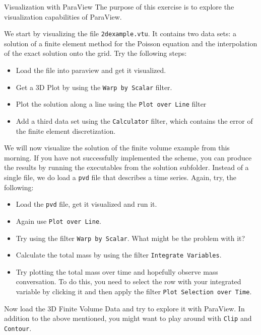 \documentclass[12pt,a4paper]{article}
\begin{document}
\begin{Exercise}{Visualization with ParaView}
 The purpose of this exercise is to explore the visualization capabilities of ParaView.

 We start by visualizing the file \lstinline!2dexample.vtu!. It contains two data sets: a solution of a finite element method
 for the Poisson equation and the interpolation of the exact solution onto the grid. Try the following steps:
 \begin{itemize}
  \item Load the file into paraview and get it visualized.
  \item Get a 3D Plot by using the \lstinline!Warp by Scalar! filter.
  \item Plot the solution along a line using the \lstinline!Plot over Line! filter
  \item Add a third data set using the \lstinline!Calculator! filter, which contains the error of the finite element discretization.
 \end{itemize}

 We will now visualize the solution of the finite volume example from this morning. If you have not successfully implemented the scheme,
 you can produce the results by running the executables from the solution subfolder. Instead of a single file, we do load a \lstinline!pvd!
 file that describes a time series. Again, try, the following:
 \begin{itemize}
  \item Load the \lstinline!pvd! file, get it visualized and run it.
  \item Again use \lstinline!Plot over Line!.
  \item Try using the filter \lstinline!Warp by Scalar!. What might be the problem with it?
  \item Calculate the total mass by using the filter \lstinline!Integrate Variables!.
  \item Try plotting the total mass over time and hopefully observe mass conversation. To do this,
  you need to select the row with your integrated variable by clicking it and then apply the filter
  \lstinline!Plot Selection over Time!.
 \end{itemize}

 Now load the 3D Finite Volume Data and try to explore it with ParaView. In addition to the above mentioned,
 you might want to play around with \lstinline!Clip! and \lstinline!Contour!.
\end{Exercise}
\end{document}
